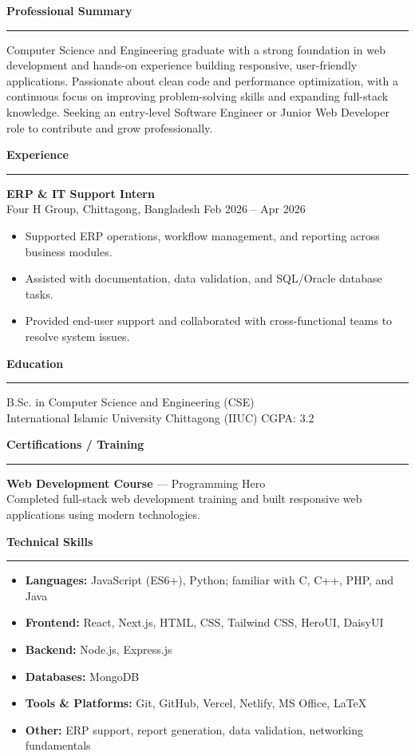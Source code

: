 \documentclass[10pt,a4paper]{article}
\newcommand{\rightsection}[1]{%
    \vspace{6pt}
    {\color{textdark}\large\bfseries #1}\\[-2pt]
    {\color{accent}\rule{\linewidth}{0.8pt}}\vspace{4pt}
}
\begin{document}
\hfill
\begin{minipage}[t][0.95\textheight][t]{0.62\textwidth}

\rightsection{Professional Summary}
{\small
Computer Science and Engineering graduate with a strong foundation in web development and hands-on experience building responsive, user-friendly applications. Passionate about clean code and performance optimization, with a continuous focus on improving problem-solving skills and expanding full-stack knowledge. Seeking an entry-level Software Engineer or Junior Web Developer role to contribute and grow professionally.
}
\vspace{5pt}

\rightsection{Experience}
\textbf{ERP \& IT Support Intern}\\
{\small Four H Group, Chittagong, Bangladesh \hfill Feb 2026 -- Apr 2026}
\begin{itemize}
    \item Supported ERP operations, workflow management, and reporting across business modules.
    \item Assisted with documentation, data validation, and SQL/Oracle database tasks.
    \item Provided end-user support and collaborated with cross-functional teams to resolve system issues.
\end{itemize}
\vspace{5pt}

\rightsection{Education}
	{B.Sc. in Computer Science and Engineering (CSE)}\\
{\small International Islamic University Chittagong (IIUC) \hfill CGPA: 3.2}
\vspace{5pt}

\rightsection{Certifications / Training}
{\small
\textbf{Web Development Course} --- Programming Hero\\
Completed full-stack web development training and built responsive web applications using modern technologies.
}
\vspace{5pt}

\rightsection{Technical Skills}
\begin{itemize}
    \item \textbf{Languages:} JavaScript (ES6+), Python; familiar with C, C++, PHP, and Java
    \item \textbf{Frontend:} React, Next.js, HTML, CSS, Tailwind CSS, HeroUI, DaisyUI
    \item \textbf{Backend:} Node.js, Express.js
    \item \textbf{Databases:} MongoDB
    \item \textbf{Tools \& Platforms:} Git, GitHub, Vercel, Netlify, MS Office, LaTeX
    \item \textbf{Other:} ERP support, report generation, data validation, networking fundamentals
\end{itemize}
\vspace{5pt}


\end{minipage}
\end{document}
